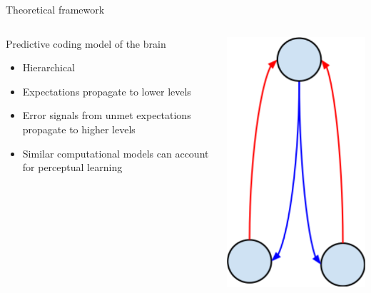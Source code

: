 \documentclass{beamer}
\begin{document}
\begin{frame}{Theoretical framework}
\begin{columns}[T]
\begin{column}{.68\textwidth}
Predictive coding model of the brain 

\citep{Clark2013}
  \begin{itemize}
\item Hierarchical
\item Expectations propagate to lower levels
\item Error signals from unmet expectations propagate to higher levels
\item Similar computational models can account for perceptual learning \citep{Kleinschmidt2011}
  \end{itemize}
\end{column}
\hfill
\begin{column}{.3\textwidth}
\includegraphics[width=\textwidth]{graphs/PCschema.pdf}
\end{column}
\end{columns}
\end{frame}
\end{document}
